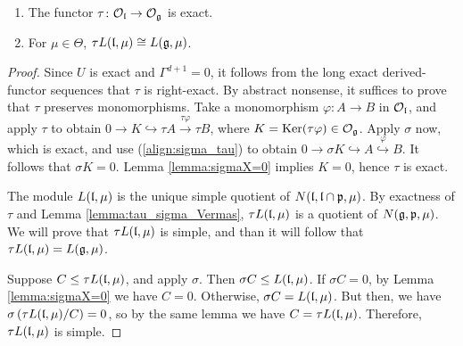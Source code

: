 \documentclass[a4paper,10pt]{article}
\begin{document}
\begin{lemma}
\begin{enumerate}
\item The functor $\tau \colon \mathcal{O}_{\mathfrak{l}} \to \mathcal{O}_{\mathfrak{g}}$ is exact.
\item For $\mu \in \Theta$, $\tau L(\mathfrak{l},\mu) \cong L(\mathfrak{g},\mu)$.
\end{enumerate}
\end{lemma}
%
\begin{proof}
Since $U$ is exact and $\Gamma^{d+1}=0$, it follows from the long exact derived-functor sequences that $\tau$ is right-exact. By abstract nonsense, it suffices to prove that $\tau$ preserves monomorphisms. Take a monomorphism $\varphi \colon A \to B$ in $\mathcal{O}_{\mathfrak{l}}$, and apply $\tau$ to obtain $0 \to K \hookrightarrow \tau A \stackrel{\tau \varphi}{\longrightarrow} \tau B$, where $K=\operatorname{Ker}(\tau \varphi) \in \mathcal{O}_{\mathfrak{g}}$. Apply $\sigma$ now, which is exact, and use (\ref{align:sigma_tau}) to obtain $0 \to \sigma K \hookrightarrow A \stackrel{\varphi}{\hookrightarrow} B$. It follows that $\sigma K =0$. Lemma \ref{lemma:sigmaX=0} implies $K=0$, hence $\tau$ is exact.

The module $L(\mathfrak{l},\mu)$ is the unique simple quotient of $N(\mathfrak{l,l\cap p},\mu)$. By exactness of $\tau$ and Lemma \ref{lemma:tau_sigma_Vermas}, $\tau L(\mathfrak{l},\mu)$ is a quotient of $N(\mathfrak{g, p},\mu)$. We will prove that $\tau L(\mathfrak{l},\mu)$ is simple, and than it will follow that $\tau L(\mathfrak{l},\mu)=L(\mathfrak{g},\mu)$.

Suppose $C \leq \tau L(\mathfrak{l},\mu)$, and apply $\sigma$. Then $\sigma C \leq L(\mathfrak{l},\mu)$. If $\sigma C =0$, by Lemma \ref{lemma:sigmaX=0} we have $C=0$. Otherwise, $\sigma C = L(\mathfrak{l},\mu)$. But then, we have $\sigma \left( \tau L(\mathfrak{l},\mu) / C \right) =0$, so by the same lemma we have $C=\tau L(\mathfrak{l},\mu)$. Therefore, $\tau L(\mathfrak{l},\mu)$ is simple.
\end{proof}
\end{document}
